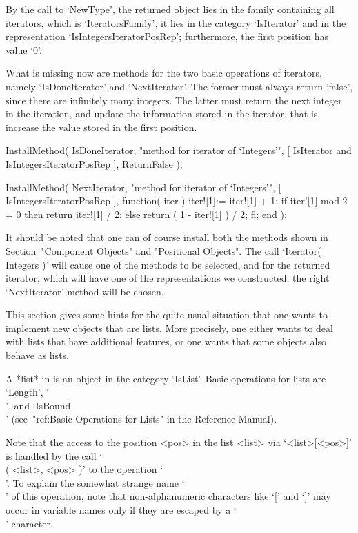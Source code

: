 By the call to `NewType', the returned object lies in the family
containing all iterators, which is `IteratorsFamily',
it lies in the category `IsIterator' and in the representation
`IsIntegersIteratorPosRep';
furthermore, the first position has value `0'.

What is missing now are methods for the two basic operations
of iterators, namely `IsDoneIterator' and `NextIterator'.
The former must always return `false', since there are infinitely
many integers.
The latter must return the next integer in the iteration,
and update the information stored in the iterator,
that is, increase the value stored in the first position.

\begintt
InstallMethod( IsDoneIterator,
    "method for iterator of `Integers'",
    [ IsIterator and IsIntegersIteratorPosRep ],
    ReturnFalse );

InstallMethod( NextIterator,
    "method for iterator of `Integers'",
    [ IsIntegersIteratorPosRep ],
    function( iter )
    iter![1]:= iter![1] + 1;
    if iter![1] mod 2 = 0 then
      return iter![1] / 2;
    else
      return ( 1 - iter![1] ) / 2;
    fi;
    end );
\endtt

It should be noted that one can of course install both the methods shown
in Section~"Component Objects" and "Positional Objects".
The call `Iterator( Integers )' will cause one of the methods to be
selected, and for the returned iterator, which will have one of the
representations we constructed, the right `NextIterator' method
will be chosen.


This section gives some hints for the quite usual situation that one wants
to implement new objects that are lists.
More precisely, one either wants to deal with lists that have additional
features, or one wants that some objects also behave as lists.

A *list* in {\GAP} is an object in the category `IsList'.
Basic operations for lists are `Length', `\\[\\]', and `IsBound\\[\\]'
(see~"ref:Basic Operations for Lists" in the Reference Manual).

Note that the access to the position <pos> in the list <list>
via `<list>[<pos>]' is handled by the call `\\[\\]( <list>, <pos> )'
to the operation `\\[\\]'.
To explain the somewhat strange name `\\[\\]' of this operation,
note that non-alphanumeric characters like `[' and `]' may occur in
{\GAP} variable names only if they are escaped by a `\\' character.

